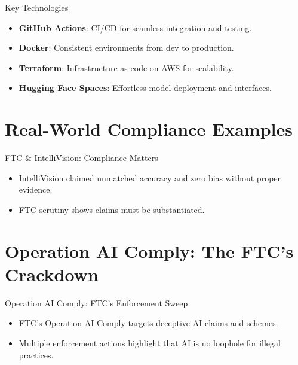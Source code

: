 \documentclass[aspectratio=169]{beamer}
\begin{document}
\begin{frame}{Key Technologies}
\begin{itemize}
\item \textbf{GitHub Actions}: CI/CD for seamless integration and testing.
\item \textbf{Docker}: Consistent environments from dev to production.
\item \textbf{Terraform}: Infrastructure as code on AWS for scalability.
\item \textbf{Hugging Face Spaces}: Effortless model deployment and interfaces.
\end{itemize}
\end{frame}

\section{Real-World Compliance Examples}

\begin{frame}{FTC \& IntelliVision: Compliance Matters}
\begin{itemize}
\item IntelliVision claimed unmatched accuracy and zero bias without proper evidence.
\item FTC scrutiny shows claims must be substantiated.
\end{itemize}
\end{frame}

\section{Operation AI Comply: The FTC’s Crackdown}

\begin{frame}{Operation AI Comply: FTC’s Enforcement Sweep}
\begin{itemize}
\item FTC’s Operation AI Comply targets deceptive AI claims and schemes.
\item Multiple enforcement actions highlight that AI is no loophole for illegal practices.
\end{itemize}
\end{frame}
\end{document}
